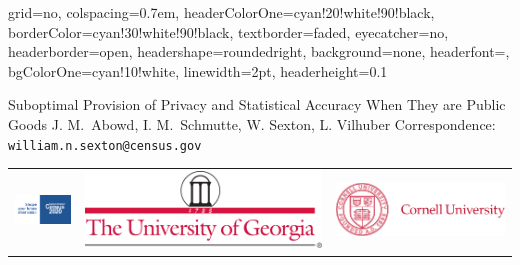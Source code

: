 \documentclass[landscape]{baposter}
\begin{document}
\begin{poster}{
 grid=no,
 colspacing=0.7em,
 headerColorOne=cyan!20!white!90!black,
 borderColor=cyan!30!white!90!black,
 textborder=faded,
 eyecatcher=no,
 headerborder=open,
 headershape=roundedright,
 background=none,
 headerfont=\Large\textsf, %
 bgColorOne=cyan!10!white,
 linewidth=2pt,
 headerheight=0.1\textheight}
 {

 }
 {\sf Suboptimal Provision of Privacy and Statistical Accuracy \newline When They are Public Goods}
 {
 \sf J. M.\ Abowd, I. M.\ Schmutte, W. Sexton, L. Vilhuber
 \hspace{3em}
 {Correspondence: \texttt{william.n.sexton@census.gov}}
 }
 {
  \begin{tabular}{rrr}
    \includegraphics[height=0.04\textheight]{census} &
    \includegraphics[height=0.04\textheight]{thick4c} &
    \includegraphics[height=0.04\textheight]{CULogo4c}
  \end{tabular}
 }


\end{poster}
\end{document}
